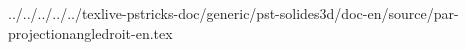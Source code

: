 ../../../../../texlive-pstricks-doc/generic/pst-solides3d/doc-en/source/par-projectionangledroit-en.tex